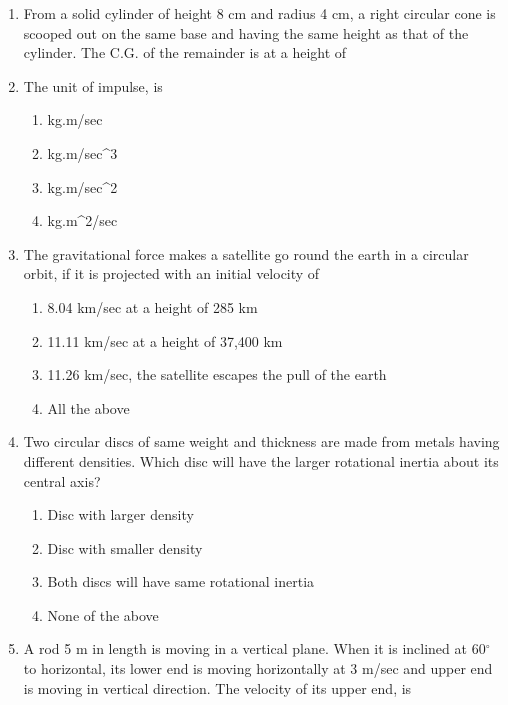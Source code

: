 \documentclass[11pt,a4paper]{article}
\begin{document}
\begin{enumerate}
\begin{enumerate}[label=\Alph*.]
\end{enumerate}
\item{From a solid cylinder of height 8 cm and radius 4 cm, a right circular cone is scooped out on the same base and having the same height as that of the cylinder. The C.G. of the remainder is at a height of}
\\\begin{enumerate*}[itemjoin=\qquad, label=\Alph*.]
\item{4.5 cm}
\item{5.0 cm}
\item{5.25 cm}
\item{5.5 cm}
\end{enumerate*}
\item{The unit of impulse, is}
\begin{enumerate}[label=\Alph*.]
\item{kg.m/sec}
\item{kg.m/sec\^{}3}
\item{kg.m/sec\^{}2}
\item{kg.m\^{}2/sec}
\end{enumerate}
\item{The gravitational force makes a satellite go round the earth in a circular orbit, if it is projected with an initial velocity of}
\begin{enumerate}[label=\Alph*.]
\item{8.04 km/sec at a height of 285 km}
\item{11.11 km/sec at a height of 37,400 km}
\item{11.26 km/sec, the satellite escapes the pull of the earth}
\item{All the above}
\end{enumerate}
\item{Two circular discs of same weight and thickness are made from metals having different densities. Which disc will have the larger rotational inertia about its central axis?}
\begin{enumerate}[label=\Alph*.]
\item{Disc with larger density}
\item{Disc with smaller density}
\item{Both discs will have same rotational inertia}
\item{None of the above}
\end{enumerate}
\item{A rod 5 m in length is moving in a vertical plane. When it is inclined at 60$^\circ$ to horizontal, its lower end is moving horizontally at 3 m/sec and upper end is moving in vertical direction. The velocity of its upper end, is
}
\end{enumerate}
\end{document}
